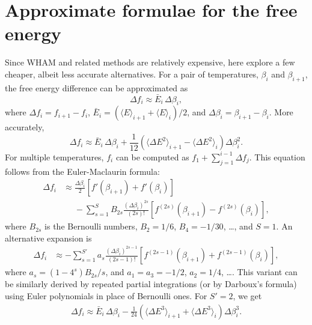\documentclass[reprint,aip,jcp,superscriptaddress]{revtex4-1}
\begin{document}
\section{\label{sec:approxf}
Approximate formulae for the free energy}



Since WHAM and related methods
are relatively expensive,
here explore a few cheaper,
albeit less accurate alternatives.
%
For a pair of temperatures,
$\beta_i$ and $\beta_{i+1}$,
the free energy difference
can be approximated as\cite{park2007}
%
\begin{equation}
\Delta f_i
\approx
\bar E_i \, \Delta \beta_i,
\label{eq:df_eav}
\end{equation}
where
$\Delta f_i = f_{i+1} - f_i$,
$\bar E_i = (\langle E \rangle_{i+1} + \langle E \rangle_i)/2$,
and
$\Delta \beta_i = \beta_{i + 1} - \beta_i$.
%
More accurately,
%
\begin{equation}
\Delta f_i
\approx
\bar E_i \, \Delta \beta_i
+
\frac{1}{12} \left(
  \langle \Delta E^2 \rangle_{i + 1}
  -
  \langle \Delta E^2 \rangle_{i}
\right)
\Delta \beta_i^2.
\label{eq:df_eavb}
\end{equation}
%
For multiple temperatures, $f_i$
can be computed as
$f_1 + \sum_{j = 1}^{i - 1} \Delta f_j$.
%
This equation follows from
the Euler-Maclaurin formula\cite{
arfken, whittaker, wang_specfunc, abramowitz}:
%
\begin{align*}
\Delta f_i
&\approx
\frac{\Delta \beta_i}{2}
\left[
  f'(\beta_{i+1}) + f'(\beta_i)
\right]
\\
&\phantom{=}
-
\sum_{s = 1}^{S}
  B_{2s}
  \frac{ (\Delta \beta_i)^{2s} } { (2 s)! }
  \left[
    f^{(2s)}(\beta_{i+1})
    -
    f^{(2s)}(\beta_i)
  \right],
\end{align*}
%
where $B_{2s}$ is the Bernoulli numbers,
$B_2 = 1/6$, $B_4 = -1/30$, \ldots,
and $S = 1$.
%
An alternative expansion is
%
\begin{align*}
\Delta f_i
&\approx
-\sum_{s = 1}^{S'}
  a_s
  \frac{ (\Delta \beta_i)^{2s - 1} } { (2 s - 1)! }
  \left[
    f^{(2s-1)}(\beta_{i+1})
    +
    f^{(2s-1)}(\beta_i)
  \right],
\end{align*}
where
$a_s = (1 - 4^s) B_{2s} /s$,
%
and
$a_1 = a_3 = -1/2$,
$a_2 = 1/4$,
\dots.
%
This variant can be similarly derived
by repeated partial integrations
(or by Darboux's formula\cite{
whittaker, wang_specfunc})
using Euler polynomials\cite{
wang_specfunc, abramowitz}
in place of Bernoulli ones.
%
For $S' = 2$, we get
\begin{align}
\Delta f_i
\approx
\bar E_i \, \Delta \beta_i
-
\frac{1}{24} \left(
  \langle \Delta E^3 \rangle_{i + 1}
  +
  \langle \Delta E^3 \rangle_{i}
\right)
\Delta \beta_i^3.
\label{eq:df_eavc}
\end{align}
\end{document}
